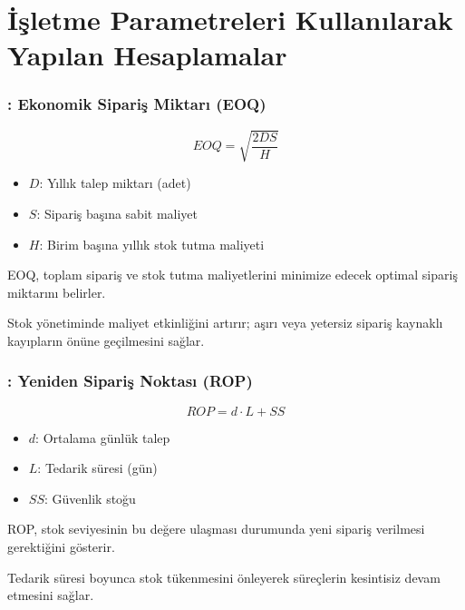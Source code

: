 \documentclass[12pt]{beamer}
\begin{document}
	\section{İşletme Parametreleri Kullanılarak Yapılan Hesaplamalar}
	\begin{frame}
		\frametitle{\insertsection: Ekonomik Sipariş Miktarı (EOQ)}
		\begin{equation}
			EOQ = \sqrt{\frac{2DS}{H}}
		\end{equation}
		\begin{itemize}
			\item $D$: Yıllık talep miktarı (adet)
			\item $S$: Sipariş başına sabit maliyet
			\item $H$: Birim başına yıllık stok tutma maliyeti
		\end{itemize}
		
		\begin{tcolorbox}
			EOQ, toplam sipariş ve stok tutma maliyetlerini minimize edecek
			optimal sipariş miktarını belirler.
		\end{tcolorbox}
		
		\begin{tcolorbox}
			Stok yönetiminde maliyet etkinliğini artırır; aşırı veya
			yetersiz sipariş kaynaklı kayıpların önüne geçilmesini sağlar.
		\end{tcolorbox}
	\end{frame}
	
	\begin{frame}
		\frametitle{\insertsection: Yeniden Sipariş Noktası (ROP)}
		\begin{equation}
			ROP = d \cdot L + SS
		\end{equation}
		\begin{itemize}
			\item $d$: Ortalama günlük talep
			\item $L$: Tedarik süresi (gün)
			\item $SS$: Güvenlik stoğu
		\end{itemize}
		
		\begin{tcolorbox}
			ROP, stok seviyesinin bu değere ulaşması durumunda yeni sipariş
			verilmesi gerektiğini gösterir.
		\end{tcolorbox}
		
		\begin{tcolorbox}
			Tedarik süresi boyunca stok tükenmesini önleyerek süreçlerin
			kesintisiz devam etmesini sağlar.
		\end{tcolorbox}
	\end{frame}
	
\end{document}

